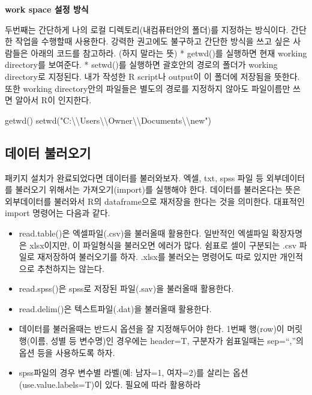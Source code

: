\documentclass[
]{book}
\newenvironment{Shaded}{\begin{snugshade}}{\end{snugshade}}
\newcommand{\FunctionTok}[1]{\textcolor[rgb]{0.00,0.00,0.00}{#1}}
\newcommand{\NormalTok}[1]{#1}
\newcommand{\SpecialCharTok}[1]{\textcolor[rgb]{0.00,0.00,0.00}{#1}}
\newcommand{\StringTok}[1]{\textcolor[rgb]{0.31,0.60,0.02}{#1}}
\providecommand{\tightlist}{%
  \setlength{\itemsep}{0pt}\setlength{\parskip}{0pt}}
\theoremstyle{definition}
\theoremstyle{definition}
\theoremstyle{definition}
\theoremstyle{definition}
\theoremstyle{remark}
\begin{document}
\textbf{work space 설정 방식}

두번째는 간단하게 나의 로컬 디렉토리(내컴퓨터안의 폴더)를 지정하는 방식이다. 간단한 작업을 수행할때 사용한다. 강력한 권고에도 불구하고 간단한 방식을 쓰고 싶은 사람들은 아래의 코드를 참고하라. (하지 말라는 뜻)
* getwd()를 실행하면 현재 working directory를 보여준다.
* setwd()를 실행하면 괄호안의 경로의 폴더가 working directory로 지정된다. 내가 작성한 R script나 output이 이 폴더에 저장됨을 뜻한다. 또한 working directory안의 파일들은 별도의 경로를 지정하지 않아도 파일이름만 쓰면 알아서 R이 인지한다.

\begin{Shaded}
\begin{Highlighting}[]
\FunctionTok{getwd}\NormalTok{()}
\FunctionTok{setwd}\NormalTok{(}\StringTok{"C:}\SpecialCharTok{\textbackslash{}\textbackslash{}}\StringTok{Users}\SpecialCharTok{\textbackslash{}\textbackslash{}}\StringTok{Owner}\SpecialCharTok{\textbackslash{}\textbackslash{}}\StringTok{Documents}\SpecialCharTok{\textbackslash{}\textbackslash{}}\StringTok{new"}\NormalTok{) }
\end{Highlighting}
\end{Shaded}

\hypertarget{uxb370uxc774uxd130-uxbd88uxb7ecuxc624uxae30}{%
\subsection{데이터 불러오기}\label{uxb370uxc774uxd130-uxbd88uxb7ecuxc624uxae30}}

패키지 설치가 완료되었다면 데이터를 불러와보자. 엑셀, txt, spss 파일 등 외부데이터를 불러오기 위해서는 가져오기(import)를 실행해야 한다. 데이터를 불러온다는 뜻은 외부데이터를 불러와서 R의 dataframe으로 재저장을 한다는 것을 의미한다. 대표적인 import 명령어는 다음과 같다.

\begin{itemize}
\tightlist
\item
  read.table()은 엑셀파일(.csv)을 불러올때 활용한다. 일반적인 엑셀파일 확장자명은 xlsx이지만, 이 파일형식을 불러오면 에러가 많다. 쉼표로 셀이 구분되는 .csv 파일로 재저장하여 불러오기를 하자. .xlsx를 불러오는 명령어도 따로 있지만 개인적으로 추천하지는 않는다.
\item
  read.spss()은 spss로 저장된 파일(.sav)을 불러올때 활용한다.
\item
  read.delim()은 텍스트파일(.dat)을 불러올때 활용한다.
\item
  데이터를 불러올때는 반드시 옵션을 잘 지정해두어야 한다. 1번째 행(row)이 머릿행(이름, 성별 등 변수명)인 경우에는 header=T, 구분자가 쉼표일때는 sep=``,''의 옵션 등을 사용하도록 하자.
\item
  spss파일의 경우 변수별 라벨(예: 남자=1, 여자=2)를 살리는 옵션(use.value.labels=T)이 있다. 필요에 따라 활용하라
\end{itemize}
\end{document}
